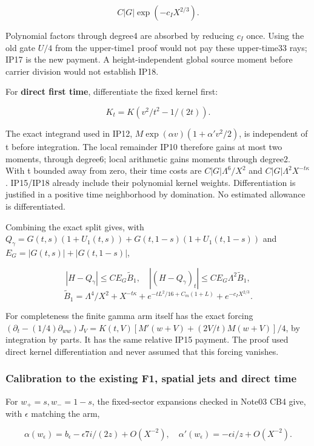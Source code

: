 \[
C |G|\exp(-c_I X^{2/3}).
\tag{IP18}\label{eq:ansatz-ip18}
\]

Polynomial factors through degree4 are absorbed by reducing \(c_{I}\) once. Using the old gate \(U/4\) from the upper-time1 proof would not pay these upper-time33 rays; IP17 is the new payment. A height-independent global source moment before carrier division would not establish IP18.

For \textbf{direct first time}, differentiate the fixed kernel first:

\[
K_t=K(v^2/t^2-1/(2t)).
\tag{IP19}\label{eq:ansatz-ip19}
\]

The exact integrand used in IP12, \(M \exp(\alpha v)(1+\alpha'v^{2}/2)\), is independent of t before integration. The local remainder IP10 therefore gains at most two moments, through degree6; local arithmetic gains moments through degree2. With t bounded away from zero, their time costs are \(C |G| \Lambda^{6}/X^{2}\) and \(C |G| \Lambda^{2} X^{-t \kappa}\). IP15/IP18 already include their polynomial kernel weights. Differentiation is justified in a positive time neighborhood by domination. No estimated allowance is differentiated.

Combining the exact split gives, with \(Q_{\gamma}=G(t,s)(1+U_{1}(t,s))+G(t,1-s)(1+U_{1}(t,1-s))\) and \(E_{G}=|G(t,s)|+|G(t,1-s)|\),

\[
|H-Q_\gamma|\le C E_G\widetilde B_1,
\quad |(H-Q_\gamma)_t|\le C E_G\Lambda^2\widetilde B_1,
\]
\[
\widetilde B_1=\Lambda^4/X^2+X^{-t\kappa}
 +e^{-tL^2/16+C_m(1+L)}+e^{-c_I X^{2/3}}.
\tag{IP20}\label{eq:ansatz-ip20}
\]

For completeness the finite gamma arm itself has the exact forcing \((\partial_{t}-(1/4)\partial_{ww})J_{V} =K(t,V)[M'(w+V)+(2V/t)M(w+V)]/4\), by integration by parts. It has the same relative IP15 payment. The proof used direct kernel differentiation and never assumed that this forcing vanishes.

\subsubsection{Calibration to the existing F1, spatial jets and direct time}
\label{subsec:ip-5}

For \(w_+=s,w_-=1-s\), the fixed-sector expansions checked in Note03 CB4 give, with \(\epsilon\) matching the arm,

\[
\alpha(w_\epsilon)=b_\epsilon-\epsilon7i/(2z)+O(X^{-2}),\quad
\alpha'(w_\epsilon)=-\epsilon i/z+O(X^{-2}).
\tag{IP21}\label{eq:ansatz-ip21}
\]

